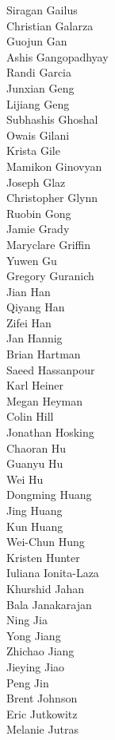 Siragan Gailus\\
Christian Galarza\\
Guojun Gan\\
Ashis Gangopadhyay\\
Randi Garcia\\
Junxian Geng\\
Lijiang Geng\\
Subhashis Ghoshal\\
Owais Gilani\\
Krista Gile\\
Mamikon Ginovyan\\
Joseph Glaz\\
Christopher Glynn\\
Ruobin Gong\\
Jamie Grady\\
Maryclare Griffin\\
Yuwen Gu\\
Gregory Guranich\\
Jian Han\\
Qiyang Han\\
Zifei Han\\
Jan Hannig\\
Brian Hartman\\
Saeed Hassanpour\\
Karl Heiner\\
Megan Heyman\\
Colin Hill\\
Jonathan Hosking\\
Chaoran Hu\\
Guanyu Hu\\
Wei Hu\\
Dongming Huang\\
Jing Huang\\
Kun Huang\\
Wei-Chun Hung\\
Kristen Hunter\\
Iuliana Ionita-Laza\\
Khurshid Jahan\\
Bala Janakarajan\\
Ning Jia\\
Yong Jiang\\
Zhichao Jiang\\
Jieying Jiao\\
Peng Jin\\
Brent Johnson\\
Eric Jutkowitz\\
Melanie Jutras\\
